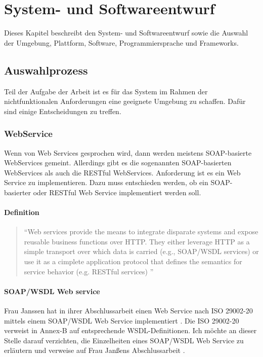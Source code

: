 \chapter{System- und Softwareentwurf} \label{kap:systemundsoftwarentwurf}


Dieses Kapitel beschreibt den System- und Softwareentwurf sowie die Auswahl der Umgebung, Plattform, Software, Programmiersprache und Frameworks.

\section{Auswahlprozess}

Teil der Aufgabe der Arbeit ist es für das System im Rahmen der nichtfunktionalen Anforderungen eine geeignete Umgebung zu schaffen. Dafür sind einige Entscheidungen zu treffen. 

\subsection{WebService}
Wenn von Web Services gesprochen wird, dann werden meistens \gls{SOAP}-basierte WebServices gemeint. Allerdings gibt es die sogenannten \gls{SOAP}-basierten WebServices als auch die RESTful WebServices. Anforderung ist es ein Web Service zu implementieren. Dazu muss entschieden werden, ob ein \gls{SOAP}-basierter oder RESTful Web Service implementiert werden soll.  

\subsubsection{Definition}

\begin{quotation}
\enquote{Web services provide the means to integrate disparate systems and expose reusable business functions over HTTP. They either leverage HTTP as a simple transport over which data is carried (e.g., SOAP/\gls{WSDL} services) or use it as a cimplete application protocol that defines the semantics for service behavior (e.g. RESTful services) \citep[S. 2][]{robinsonService}}	
\end{quotation}

\subsubsection{SOAP/WSDL Web service}
Frau Janssen hat in ihrer Abschlussarbeit einen Web Service nach ISO 29002-20 mittels einem SOAP/WSDL Web Service implementiert \citep[vgl.][]{janssen}. Die ISO 29002-20 verweist in Annex-B auf entsprechende WSDL-Definitionen. 
Ich möchte an dieser Stelle darauf verzichten, die Einzelheiten eines SOAP/WSDL Web Service zu erläutern und verweise auf Frau Janßens Abschlussarbeit \citep[vgl.][Kap. 3]{janssen}. 


